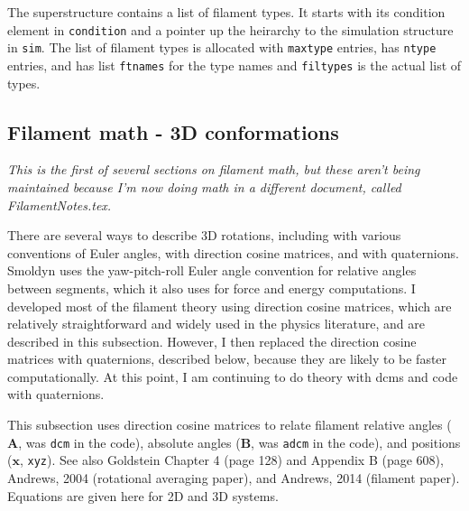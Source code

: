 \documentclass {scrbook}
\newcommand {\ttt} {\texttt}
\begin{document}
The superstructure contains a list of filament types. It starts with its condition element in \ttt{condition} and a pointer up the heirarchy to the simulation structure in \ttt{sim}. The list of filament types is allocated with \ttt{maxtype} entries, has \ttt{ntype} entries, and has list \ttt{ftnames} for the type names and \ttt{filtypes} is the actual list of types.\\

\subsection{Filament math - 3D conformations}

\textit{This is the first of several sections on filament math, but these aren't being maintained because I'm now doing math in a different document, called FilamentNotes.tex.}

There are several ways to describe 3D rotations, including with various conventions of Euler angles, with direction cosine matrices, and with quaternions. Smoldyn uses the yaw-pitch-roll Euler angle convention for relative angles between segments, which it also uses for force and energy computations. I developed most of the filament theory using direction cosine matrices, which are relatively straightforward and widely used in the physics literature, and are described in this subsection. However, I then replaced the direction cosine matrices with quaternions, described below, because they are likely to be faster computationally. At this point, I am continuing to do theory with dcms and code with quaternions.

This subsection uses direction cosine matrices to relate filament relative angles ($\bm{A}$, was \ttt{dcm} in the code), absolute angles ($\bm{B}$, was \ttt{adcm} in the code), and positions ($\bm{x}$, \ttt{xyz}). See also Goldstein Chapter 4 (page 128) and Appendix B (page 608), Andrews, 2004 (rotational averaging paper), and Andrews, 2014 (filament paper). Equations are given here for 2D and 3D systems.
\end{document}
